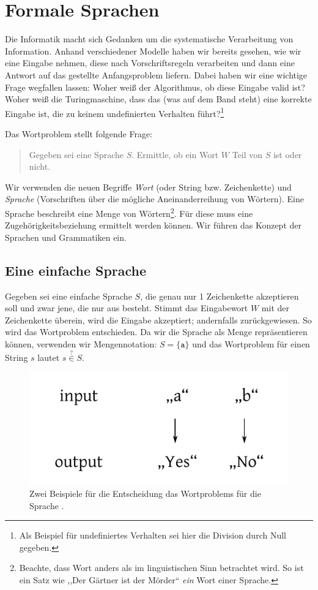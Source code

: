 \chapter{Formale Sprachen}
%
Die Informatik macht sich Gedanken um die systematische Verarbeitung von Information. Anhand verschiedener Modelle haben wir bereits gesehen, wie wir eine Eingabe nehmen, diese nach Vorschriftsregeln verarbeiten und dann eine Antwort auf das gestellte Anfangsproblem liefern. Dabei haben wir eine wichtige Frage wegfallen lassen: Woher weiß der Algorithmus, ob diese Eingabe valid ist? Woher weiß die Turingmaschine, dass das (was auf dem Band steht) eine korrekte Eingabe ist, die zu keinem undefinierten Verhalten führt?\footnote{Als Beispiel für undefiniertes Verhalten sei hier die Division durch Null gegeben.}

Das Wortproblem stellt folgende Frage:
\begin{quotation}
  Gegeben sei eine Sprache $S$. Ermittle, ob ein Wort $W$ Teil von $S$ ist oder nicht.
\end{quotation}
%
Wir verwenden die neuen Begriffe \emph{Wort} (oder String bzw. Zeichenkette) und \emph{Sprache} (Vorschriften über die mögliche Aneinanderreihung von Wörtern). Eine Sprache beschreibt eine Menge von Wörtern\footnote{Beachte, dass Wort anders als im linguistischen Sinn betrachtet wird. So ist ein Satz wie ,,Der Gärtner ist der Mörder`` \emph{ein} Wort einer Sprache.}. Für diese muss eine Zugehörigkeitsbeziehung ermittelt werden können. Wir führen das Konzept der Sprachen und Grammatiken ein.

\section{Eine einfache Sprache}
%
Gegeben sei eine einfache Sprache $S$, die genau nur 1 Zeichenkette akzeptieren soll und zwar jene, die nur aus  besteht. Stimmt das Eingabewort $W$ mit der Zeichenkette  überein, wird die Eingabe akzeptiert; andernfalls zurückgewiesen. So wird das Wortproblem entschieden. Da wir die Sprache als Menge repräsentieren können, verwenden wir Mengennotation: $S = \{\texttt{a}\}$ und das Wortproblem für einen String $s$ lautet $s \stackrel{?}{\in} S$.
%
\begin{figure}[ht]
 \begin{center}
  \includegraphics{img/wordproblem.pdf}
  \caption{Zwei Beispiele für die Entscheidung das Wortproblems für die Sprache .}
  \label{fig:wordproblem}
 \end{center}
\end{figure}

